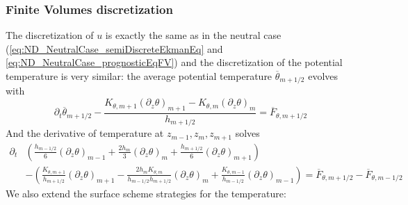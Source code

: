 \subsubsection{Finite Volumes discretization}
The discretization of $u$ is exactly the same as in the
neutral case (\eqref{eq:ND_NeutralCase_semiDiscreteEkmanEq} and \eqref{eq:ND_NeutralCase_prognosticEqFV}) and the discretization of 
the potential temperature is very similar:
the average potential temperature $\overline{\theta}_{m+1/2}$
evolves with
\begin{equation}
\label{eq:ND_StratifiedCase_semiDiscreteEkmanEqPT}
    \partial_t \overline{\theta}_{m+1/2}
    - \frac{K_{\theta, m+1} {(\partial_z \theta)}_{m+1} - K_{\theta, m} {(\partial_z \theta)}_m}{h_{m+1/2}}
	= \overline{F}_{\theta, m+1/2}
\end{equation}
And the derivative of temperature at $z_{m-1}, z_m, z_{m+1}$ solves
\begin{equation}
\begin{aligned}
\label{eq:ND_StratifiedCase_prognosticPT_FV}
\partial_t &\left( \frac{h_{m-1/2}}{6} {(\partial_z \theta)}_{m-1} 
+ \frac{2h_m}{3} {(\partial_z \theta)}_m  
+ \frac{h_{m+1/2}}{6} {(\partial_z \theta)}_{m+1} \right) \\
	&-
    \left(
	\frac{K_{\theta, m+1}}{ h_{m+1/2}}{(\partial_z \theta)}_{m+1} - \frac{2 h_m K_{\theta, m}}{h_{m-1/2} h _{m+1/2}}{(\partial_z \theta)}_m + \frac{K_{\theta, m-1}}{ h_{m-1/2}}{(\partial_z \theta)}_{m-1}
    \right)
	= \overline{F}_{\theta, m+1/2} - \overline{F}_{\theta, m-1/2}
\end{aligned}
\end{equation}
We also extend the surface scheme strategies for the temperature:
